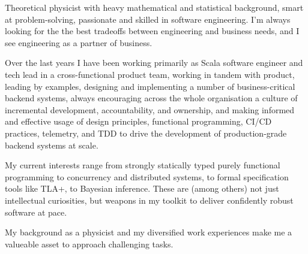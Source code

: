 
\begin{cvparagraph}
Theoretical physicist with heavy mathematical and statistical 
background, smart at problem-solving, passionate and skilled in software engineering. 
I'm always looking for the the best tradeoffs between engineering and business needs, and I see engineering as a partner of business. 

  Over the last years I have been working primarily as Scala software engineer and tech lead in a cross-functional product team, working in tandem with product, leading by examples, designing and implementing a number of business-critical backend systems, always encouraging across the whole organisation a culture of incremental development, accountability, and ownership, and making informed and effective usage of design principles, functional programming, CI/CD practices, telemetry, and TDD to drive the development of production-grade backend systems at scale. 

  My current interests range from strongly statically typed purely functional programming to concurrency and distributed systems, to formal specification tools like TLA+, to Bayesian inference. These are (among others) not just intellectual curiosities, but weapons in my toolkit to deliver confidently robust software at pace. 

My background as a physicist and my diversified work experiences make me a valueable asset to approach challenging tasks. 
\end{cvparagraph}
